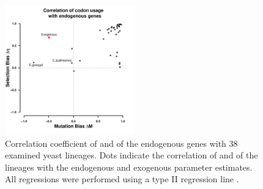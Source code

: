 \documentclass[fleqn,letterpaper]{article}
\begin{document}
\null
\vfill
\begin{figure}
     \centering
	\includegraphics[width=0.5\textwidth]{img/csp_mean_correlation_endo.pdf}
	\caption{Correlation coefficient of \DM and \DE of the endogenous genes with 38 examined yeast lineages. 
	Dots indicate the correlation of \DM and \DE of the lineages with the endogenous and exogenous parameter estimates. 
	All regressions were performed using a type II regression line \citep{SokalAndRohlf1981}.}
	\label{fig:csp_endo_comp}
\end{figure}
\null
\vfill
\clearpage


\end{document}

